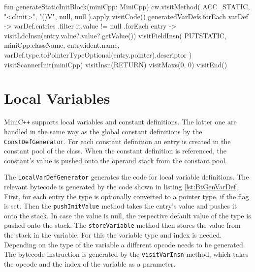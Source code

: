 
\begin{KotlinCode}[float,numbers=none,caption=Code for the initialization of static variables., label=lst:BtGenStatVarInit]
fun generateStaticInitBlock(miniCpp: MiniCpp) {
    cw.visitMethod(
        ACC_STATIC,
        "<clinit>",
        "()V",
        null,
        null
    ).apply {
        visitCode()
        generatedVarDefs.forEach { varDef ->
            varDef.entries
                .filter{ it.value != null }
                .forEach { entry ->
                visitLdcInsn(entry.value?.value?.getValue())
                visitFieldInsn(
                    PUTSTATIC,
                    miniCpp.className,
                    entry.ident.name,
                    varDef.type.toPointerTypeOptional(entry.pointer).descriptor
                )
            }
        }
        visitScannerInit(miniCpp)
        visitInsn(RETURN)
        visitMaxs(0, 0)
        visitEnd()
    }
}
\end{KotlinCode}

\section{Local Variables}

MiniC\verb|++| supports local variables and constant definitions. The latter one are handled in the same way as the global constant definitions by the \verb|ConstDefGenerator|. For each constant definition an entry is created in the constant pool of the class. When the constant definition is referenced, the constant's value is pushed onto the operand stack from the constant pool.

The \verb|LocalVarDefGenerator| generates the code for local variable definitions. The relevant bytecode is generated by the code shown in listing \ref{lst:BtGenVarDef}. First, for each entry the type is optionally converted to a pointer type, if the flag is set. Then the \verb|pushInitValue| method takes the entry's value and pushes it onto the stack. In case the value is null, the respective default value of the type is pushed onto the stack. The \verb|storeVariable| method then stores the value from the stack in the variable. For this the variable type and index is needed. Depending on the type of the variable a different opcode needs to be generated. The bytecode instruction is generated by the \verb|visitVarInsn| method, which takes the opcode and the index of the variable as a parameter. 


